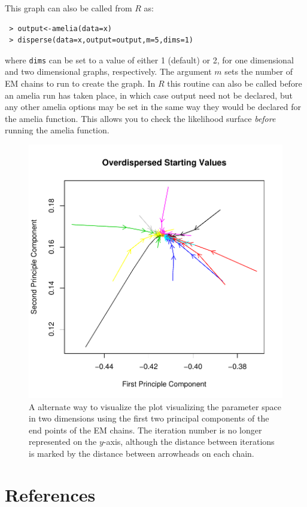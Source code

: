 \documentclass[12pt,titlepage]{article}
\begin{document}
This graph can also be called from $R$ as:
\begin{verbatim}
 > output<-amelia(data=x) 
 > disperse(data=x,output=output,m=5,dims=1)
\end{verbatim}
where \texttt{dims} can be set to a value of either 1 (default) or 2,
for one dimensional and two dimensional graphs, respectively.  The
argument $m$ sets the number of EM chains to run to create the graph.
In $R$ this routine can also be called before an amelia run has taken
place, in which case output need not be declared, but any other amelia
options may be set in the same way they would be declared for the
amelia function.  This allows you to check the likelihood surface
\emph{before} running the amelia function.


\begin{figure}
  \centering \includegraphics[scale=.7]{overdis2d.pdf}
  \caption{ A alternate way to visualize the plot visualizing the parameter space in two dimensions using the first two principal components of the end points of the EM chains.  The iteration number is no longer represented on the $y$-axis, although the distance between iterations is marked by the distance between arrowheads on each chain.}
\end{figure}



\section{References}
\label{sec:ref}
\end{document}
